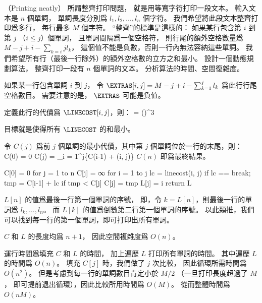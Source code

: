 \startPROBLEM
（Printing neatly）
所謂整齊打印問題，
就是用等寬字符打印一段文本。
輸入文本是 $n$ 個單詞，
單詞長度分別爲 $l_1,l_2,\ldots,l_n$ 個字符。
我們希望將此段文本整齊打印爲多行，
每行最多 $M$ 個字符。
“整齊”的標準是這樣的：
如果某行包含第 $i$ 到第 $j$ （$i\le j$）個單詞，
且單詞間隔爲一個空格符，
則行尾的額外空格數量爲 $M-j+i-\sum_{k=i}{j}l_k$，
這個值不能是負數，否則一行內無法容納這些單詞。
我們希望所有行（最後一行除外）的額外空格數的立方之和最小。
設計一個動態規劃算法，
整齊打印一段有 $n$ 個單詞的文本。
分析算法的時間、空間復雜度。
\stopPROBLEM

\startANSWER
如果某一行包含單詞 $i$ 到 $j$，
令 $\EXTRAS[i,j] = M - j + i - \sum_{k=1}^{j}l_k$ 爲此行行尾空格數目。
需要注意的是， $\EXTRAS$ 可能是負值。

定義此行的代價爲 $\LINECOST[i,j]$，則：
\startformula
\LINECOST[i,j] = \startcases
\NC \infty \NC {} \NR
{} \NC {} \NR
\NC (\EXTRAS[i,j])^3 \NC {} \NR
\stopcases
\stopformula

目標就是使得所有 $\LINECOST$ 的和最小。

令 $C(j)$ 爲前 $j$ 個單詞的最小代價，其中第 $j$ 個單詞位於一行的末尾，則：
\startformula\startmathalignment
\NC C(0) \NC = 0 \NR
\NC C(j) \NC = \min_{i = 1}^{j}\{C(i-1) + \LINECOST(i, j)\} \NR
\stopmathalignment\stopformula
$C(n)$ 即爲最終結果。

\startCLRSCODE
C[0] = 0
for j = 1 to n
	C[j] = ∞
	for i = 1 to j
		lc = linecost(i, j)
		if lc == \infty
			break;
		tmp = C[i-1] + lc
		if tmp < C[j]
			C[j] = tmp
			L[j] = i
return L
\stopCLRSCODE

$L[n]$ 的值爲最後一行第一個單詞的序號，
即，令 $k=L[n]$，則最後一行的單詞爲 $l_k,\ldots, l_n$。
而 $L[k]$ 的值爲倒數第二行第一個單詞的序號。
以此類推，我們可以找到每一行的第一個單詞，即可打印出所有單詞。

$C$ 和 $L$ 的長度均爲 $n+1$，
因此空間複雜度爲 $O(n)$。

運行時間爲填充 $C$ 和 $L$ 的時間，
加上遍歷 $L$ 打印所有單詞的時間。
其中遍歷 $L$ 的時間爲 $O(n)$。
填充 $C[j]$ 時，我們做了 $j$ 次比較，
因此循環所需時間爲 $O(n^2)$。
但是考慮到每一行的單詞數目肯定小於 $M/2$ （一旦打印長度超過了 $M$，
即可提前退出循環），因此比較所用時間爲 $O(M)$。
從而整體時間爲 $O(nM)$。
\stopANSWER
